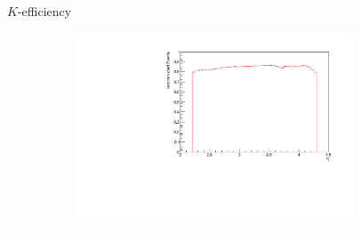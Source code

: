 \documentclass[11pt]{beamer}
\begin{document}
\begin{frame}{$K$-efficiency}
\begin{figure}
\begin{subfigure}{0.45\textwidth}
\end{subfigure}
\begin{subfigure}{0.45\textwidth}
\includegraphics[width=0.9\textwidth]{up_pdf/single/pos/h_eta_reco_K_pos.pdf}
\end{subfigure}
\end{figure}
\end{frame}
\end{document}
